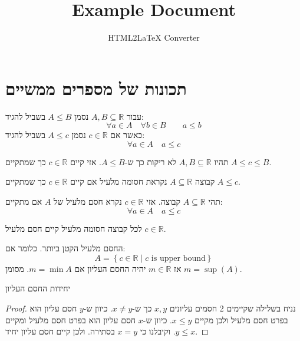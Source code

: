 \documentclass{tstextbook}
\begin{document}
\title{Example Document}
\author{HTML2LaTeX Converter}
\maketitle


\section{תכונות של מספרים ממשיים}

\begin{symbolize}
עבור \(A, B\subseteq \mathbb{R}\) נסמן \(A\leq B\) בשביל להגיד:
$$\forall a \in A\quad \forall b \in B\qquad a\leq b$$
כאשר אם \(c \in \mathbb{R}\) נסמן \(A\leq c\) בשביל להגיד:
$$\forall a \in A\quad a\leq c$$

\end{symbolize}
\begin{definition}
תהיו \(A,B \subseteq \mathbb{R}\) לא ריקות כך ש-\(A\leq B\). אזי קיים \(c \in \mathbb{R}\) כך שמתקיים \(A\leq c \leq B\).

\end{definition}
\begin{definition}
קבוצה \(A\subseteq \mathbb{R}\) נקראת חסומה מלעיל אם קיים \(c \in \mathbb{R}\) כך שמתקיים \(A\leq c\).

\end{definition}
\begin{definition}
תהי \(A\subseteq \mathbb{R}\) קבוצה. אזי \(c \in \mathbb{R}\) נקרא חסם מלעיל של \(A\) אם מתקיים:
$$\forall a \in A\quad  a \leq c$$

\end{definition}
\begin{proposition}
לכל קבוצה חסומה מלעיל קיים חסם מלעיל \(c \in \mathbb{R}\).

\end{proposition}
\begin{definition}
החסם מלעיל הקטן ביותר. כלומר אם:
$$A=\left\{  c \in \mathbb{R}\mid c \text{ is upper bound}  \right\}$$
אז \(m \in \mathbb{R}\) יהיה החסם העליון אם \(m=\min A\). מסומן \(m=\sup(A)\).

\end{definition}
\begin{proposition}
יחידות החסם העליון

\end{proposition}
\begin{proof}
נניח בשלילה שקיימים 2 חסמים עליונים \(x,y\) כך ש-\(x\neq y\). כיוון ש-\(y\) חסם עליון הוא בפרט חסם מלעיל ולכן מקיים \(x\leq y\). כיוון ש-\(x\) חסם עליון הוא בפרט חסם מלעיל ומקיים \(y\leq x\). וקיבלנו כי \(x=y\) בסתירה. ולכן קיים חסם עליון יחיד.

\end{proof}
\end{document}
